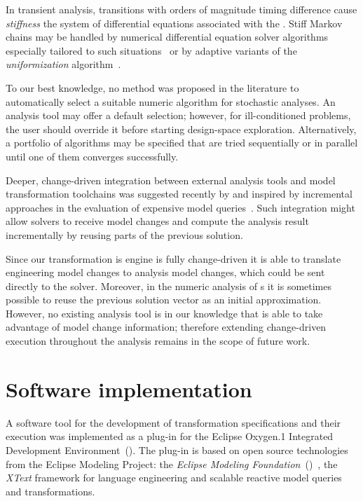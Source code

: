 In transient analysis, transitions with orders of magnitude timing difference cause \emph{stiffness} the system of differential equations associated with the . Stiff Markov chains may be handled by numerical differential equation solver algorithms especially tailored to such situations~\citep{Reibman89transient} or by adaptive variants of the \emph{uniformization} algorithm~\citep{Moorsel97uniformization,Dijk17uniformization}.

To our best knowledge, no method was proposed in the literature to automatically select a suitable numeric algorithm for stochastic analyses. An analysis tool may offer a default selection; however, for ill-conditioned problems, the user should override it before starting design-space exploration. Alternatively, a portfolio of algorithms may be specified that are tried sequentially or in parallel until one of them converges successfully.

\begin{remark}
  Deeper, change-driven integration between external analysis tools and model transformation toolchains was suggested recently by \citet{Molnar16componentwise} and \citet[Section~2.8]{Meyers16thesis} inspired by incremental approaches in the evaluation of expensive model queries~\citep{Ujhelyi15incquery}. Such integration might allow solvers to receive model changes and compute the analysis result incrementally by reusing parts of the previous solution.
  
  Since our  transformation is engine is fully change-driven it is able to translate engineering model changes to analysis model changes, which could be sent directly to the solver. Moreover, in the numeric analysis of s it is sometimes possible to reuse the previous solution vector as an initial approximation. However, no existing analysis tool is in our knowledge that is able to take advantage of model change information; therefore extending change-driven execution throughout the analysis remains in the scope of future work.
\end{remark}

\section{Software implementation}

A software tool for the development of transformation specifications and their execution was implemented as a plug-in for the Eclipse Oxygen.1 Integrated Development Environment~(). The plug-in is based on open source technologies from the Eclipse Modeling Project: the \emph{Eclipse Modeling Foundation}~()~\citep{Steinberg09emf}, the \emph{XText} framework for language engineering and \emph{} scalable reactive model queries and transformations.

